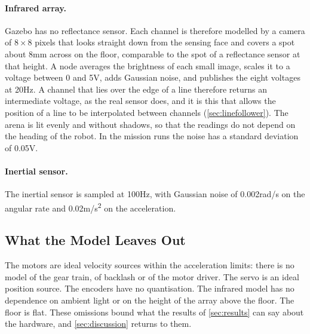 \paragraph{Infrared array.} Gazebo has no reflectance sensor. Each channel is therefore
modelled by a camera of $8\times8$ pixels that looks straight down from the sensing face
and covers a spot about 8\unit{mm} across on the floor, comparable to the spot of a
reflectance sensor at that height. A node averages the brightness of each small image,
scales it to a voltage between 0 and 5\unit{V}, adds Gaussian noise, and publishes the eight
voltages at 20\unit{Hz}. A channel that lies over the edge of a line therefore returns an
intermediate voltage, as the real sensor does, and it is this that allows the position of a
line to be interpolated between channels (\cref{sec:linefollower}). The arena is lit evenly
and without shadows, so that the readings do not depend on the heading of the robot. In the
mission runs the noise has a standard deviation of 0.05\unit{V}.

\paragraph{Inertial sensor.} The inertial sensor is sampled at 100\unit{Hz}, with Gaussian
noise of 0.002\unit{rad/s} on the angular rate and 0.02\unit{m/s^2} on the acceleration.

\subsection{What the Model Leaves Out}
The motors are ideal velocity sources within the acceleration limits: there is no model of
the gear train, of backlash or of the motor driver. The servo is an ideal position source.
The encoders have no quantisation. The infrared model has no dependence on ambient light or
on the height of the array above the floor. The floor is flat. These omissions bound what
the results of \cref{sec:results} can say about the hardware, and \cref{sec:discussion}
returns to them.
